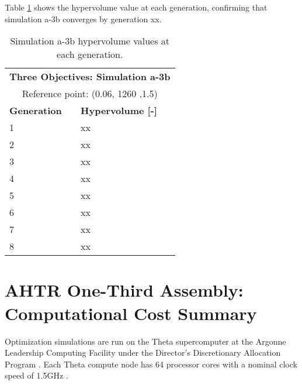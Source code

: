 Table \ref{tab:a3b-hypervolume} shows the hypervolume value at each generation, 
confirming that simulation a-3b converges by generation xx. 
\begin{table}[htbp!]
    \centering
    \onehalfspacing
    \caption{Simulation a-3b hypervolume values at each generation.}
	\label{tab:a3b-hypervolume}
    \footnotesize
    \begin{tabular}{ll}
    \hline 
    \multicolumn{2}{c}{\textbf{Three Objectives: Simulation a-3b}} \\
    \multicolumn{2}{c}{Reference point: (0.06, 1260 ,1.5)} \\
    \hline 
    \textbf{Generation} & \textbf{Hypervolume [-]} \\
    \hline
    1 & xx \\
    2 & xx \\
    3 & xx \\
    4 & xx \\
    5 & xx \\
    6 & xx \\
    7 & xx \\
    8 & xx \\
    \hline
    \end{tabular}
\end{table}

\pagebreak
\section{AHTR One-Third Assembly: Computational Cost Summary}
\label{sec:assem-compute-cost}
Optimization simulations are run on the Theta supercomputer at the Argonne Leadership 
Computing Facility under the Director's Discretionary Allocation Program 
\cite{noauthor_argonne_2022}. 
Each Theta compute node has 64 processor cores with a nominal clock speed of 
1.5GHz \cite{noauthor_argonne_2022}.  


